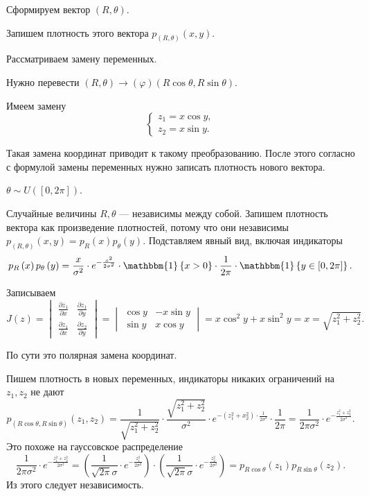Сформируем вектор $ \left( R, \theta \right) $.

Запишем плотность этого вектора $p_{ \left( R, \theta \right) } \left( x, y \right) $.

Рассматриваем замену переменных.

Нужно перевести
$ \left( R, \theta \right) \to \left( \varphi \right)
  \left( R \cos \theta, R \sin \theta \right) $.

Имеем замену
$$ \begin{cases}
    z_1 = x \cos y, \\
    z_2 = x \sin y.
  \end{cases}$$

Такая замена координат приводит к такому преобразованию.
После этого согласно с формулой замены переменных нужно записать плотность нового вектора.

$ \theta \sim U \left( \left[ 0, 2 \pi \right] \right) $.

Случайные величины $R, \theta $ --- независимы между собой.
Запишем плотность вектора как произведение плотностей,
потому что они независимы
$p_{ \left( R, \theta \right) } \left( x, y \right) =
  p_R \left( x \right) p_{ \theta } \left( y \right) $.
Подставляем явный вид, включая индикаторы
$$p_R \left( x \right) p_{ \theta } \left( y \right) =
  \frac{x}{ \sigma^2} \cdot e^{- \frac{x^2}{2 \sigma^2}} \cdot
  \mathbbm{1} \left\{ x > 0 \right\} \cdot \frac{1}{2 \pi } \cdot
  \mathbbm{1} \left\{ y \in \left[ 0, 2 \pi \right] \right\}.$$

Записываем
$$J \left( z \right) =
  \begin{vmatrix}
    \frac{ \partial z_1}{ \partial x} & \frac{ \partial z_1}{ \partial y} \\
    \frac{ \partial z_1}{ \partial x} & \frac{ \partial z_2}{ \partial y}
  \end{vmatrix} =
  \begin{vmatrix}
    \cos y & -x \sin y \\
    \sin y & x \cos y
  \end{vmatrix} =
  x \cos^2 y + x \sin^2 y =
  x =
  \sqrt{z_1^2 + z_2^2}.$$

По сути это полярная замена координат.

Пишем плотность в новых переменных, индикаторы никаких ограничений на $z_1, z_2$ не дают
$$p_{ \left( R \cos \theta, R \sin \theta \right) } \left( z_1, z_2 \right) =
  \frac{1}{ \sqrt{z_1^2 + z_2^2}} \cdot \frac{ \sqrt{z_1^2 + z_2^2}}{ \sigma^2} \cdot
  e^{- \left( z_1^2 + x_2^2 \right) \cdot \frac{1}{2 \sigma^2}} \cdot \frac{1}{2 \pi } =
  \frac{1}{2 \pi \sigma^2} \cdot e^{- \frac{z_1^2 + z_2^2}{2 \sigma^2}}.$$
Это похоже на гауссовское распределение
$$ \frac{1}{2 \pi \sigma^2} \cdot e^{- \frac{z_1^2 + z_2^2}{2 \sigma^2}} =
  \left( \frac{1}{ \sqrt{2 \pi } \sigma } \cdot e^{- \frac{z_1^2}{2 \sigma^2}} \right) \cdot
  \left( \frac{1}{ \sqrt{2 \pi } \sigma } \cdot e^{- \frac{z_2^2}{2 \sigma^2}} \right) =
  p_{R \cos \theta } \left( z_1 \right) p_{R \sin \theta } \left( z_2 \right).$$
Из этого следует независимость.

